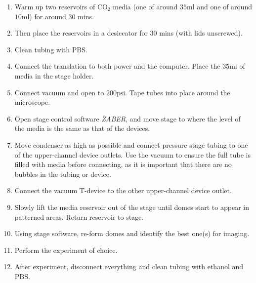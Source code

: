 \begin{enumerate}
 \setlength\itemsep{-0.1em}
	\item Warm up two reservoirs of CO$_2$ media (one of around $35  \text{ml}$ and one of around $10  \text{ml}$) for around 30 mins.
	\item Then place the reservoirs in a desiccator for 30 mins (with lids unscrewed).
	\item Clean tubing with PBS.
	\item Connect the translation to both power and the computer. Place the $35  \text{ml}$ of media in the stage holder.
	\item Connect vacuum and open to  $200  \text{psi}$. Tape tubes into place around the microscope.
	\item Open stage control software \textit{ZABER}, and move stage to where the level of the media is the same as that of the devices.
	\item Move condenser as high as possible and connect pressure stage tubing to one of the upper-channel device outlets. Use the vacuum to ensure the full tube is filled with media before connecting, as it is important that there are no bubbles in the tubing or device.
	\item Connect the vacuum T-device to the other upper-channel device outlet.
	\item Slowly lift the media reservoir out of the stage until domes start to appear in patterned areas. Return reservoir to stage.
	\item Using stage software, re-form domes and identify the best one(s) for imaging.
	\item Perform the experiment of choice.
	\item After experiment, disconnect everything and clean tubing with ethanol and PBS.
\end{enumerate}
